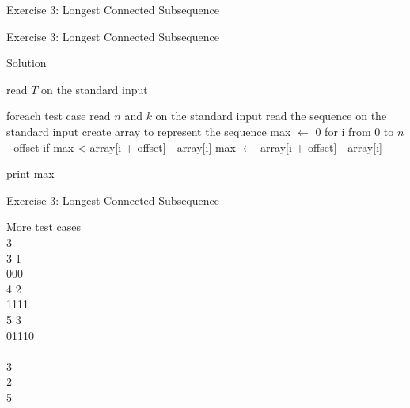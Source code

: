 \documentclass{beamer}
\begin{document}
\begin{frame}{Exercise 3: Longest Connected Subsequence}
\begin{overlayarea}{\textwidth}{\textheight}
  
  \end{overlayarea}
\end{frame}

\begin{frame}[fragile]{Exercise 3: Longest Connected Subsequence}

  \begin{code}{Solution}
    \begin{PseudoCode}
read $T$ on the standard input

foreach test case
    read $n$ and $k$ on the standard input
    read the sequence on the standard input
    create array to represent the sequence
    max $\leftarrow$ 0
    for i from 0 to $n$ - offset
        if max < array[i + offset] - array[i]
            max $\leftarrow$ array[i + offset] - array[i]

print max
    \end{PseudoCode}
  \end{code}
\end{frame}

\begin{frame}{Exercise 3: Longest Connected Subsequence}

  \begin{exampleblock}{More test cases}
    \\
    3\\3 1\\000\\
    4 2\\1111\\
    5 3\\01110\\
    
    \medskip
    \\
    3\\2\\5
  \end{exampleblock}
\end{frame}
\end{document}
